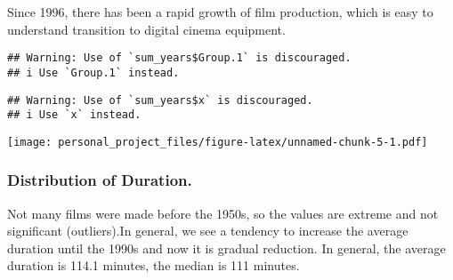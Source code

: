 \documentclass[
]{article}
\newenvironment{Shaded}{\begin{snugshade}}{\end{snugshade}}
\newcommand{\AttributeTok}[1]{\textcolor[rgb]{0.77,0.63,0.00}{#1}}
\newcommand{\ControlFlowTok}[1]{\textcolor[rgb]{0.13,0.29,0.53}{\textbf{#1}}}
\newcommand{\DecValTok}[1]{\textcolor[rgb]{0.00,0.00,0.81}{#1}}
\newcommand{\FloatTok}[1]{\textcolor[rgb]{0.00,0.00,0.81}{#1}}
\newcommand{\FunctionTok}[1]{\textcolor[rgb]{0.00,0.00,0.00}{#1}}
\newcommand{\NormalTok}[1]{#1}
\newcommand{\OtherTok}[1]{\textcolor[rgb]{0.56,0.35,0.01}{#1}}
\newcommand{\SpecialCharTok}[1]{\textcolor[rgb]{0.00,0.00,0.00}{#1}}
\newcommand{\StringTok}[1]{\textcolor[rgb]{0.31,0.60,0.02}{#1}}
\begin{document}
Since 1996, there has been a rapid growth of film production, which is
easy to understand transition to digital cinema equipment.

\begin{Shaded}
\end{Shaded}

\begin{verbatim}
## Warning: Use of `sum_years$Group.1` is discouraged.
## i Use `Group.1` instead.
\end{verbatim}

\begin{verbatim}
## Warning: Use of `sum_years$x` is discouraged.
## i Use `x` instead.
\end{verbatim}

\texttt{[image: personal\_project\_files/figure-latex/unnamed-chunk-5-1.pdf]}

\hypertarget{distribution-of-duration.}{%
\subsubsection{Distribution of
Duration.}\label{distribution-of-duration.}}

Not many films were made before the 1950s, so the values are extreme and
not significant (outliers).In general, we see a tendency to increase the
average duration until the 1990s and now it is gradual reduction. In
general, the average duration is 114.1 minutes, the median is 111
minutes.
\end{document}
